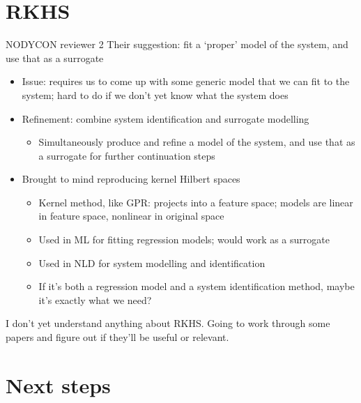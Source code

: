 \documentclass[presentation]{beamer}
\begin{document}
\section{RKHS}
\label{sec:org492c638}
\begin{frame}[label={sec:org52ee4dd},plain]{NODYCON reviewer 2}
Their suggestion: fit a `proper' model of the system, and use that as a surrogate
\begin{itemize}
\item Issue: requires us to come up with some generic model that we can fit to the system; hard to do if we don't yet know what the system does
\item Refinement: combine system identification and surrogate modelling
\begin{itemize}
\item Simultaneously produce and refine a model of the system, and use that as a surrogate for further continuation steps
\end{itemize}
\end{itemize}
\vfill
\begin{itemize}
\item Brought to mind reproducing kernel Hilbert spaces
\begin{itemize}
\item Kernel method, like GPR: projects into a feature space; models are linear in feature space, nonlinear in original space
\item Used in ML for fitting regression models; would work as a surrogate
\item Used in NLD for system modelling and identification
\item If it's both a regression model and a system identification method, maybe it's exactly what we need?
\end{itemize}
\end{itemize}
\vfill
I don't yet understand anything about RKHS. Going to work through some papers and figure out if they'll be useful or relevant.
\end{frame}

\section{Next steps}
\label{sec:org62808c4}
\end{document}
